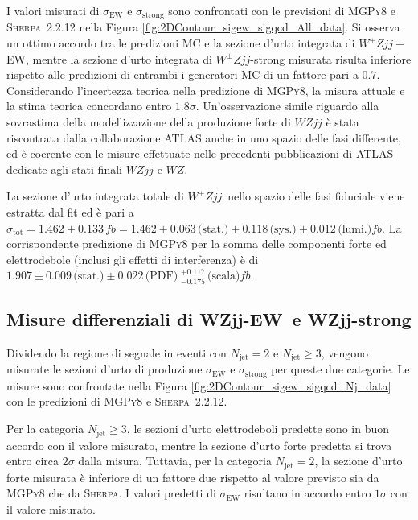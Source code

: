 \documentclass[11pt]{article}
\newcommand{\wzjjew}{$W^\pm Z jj-$ EW}
\newcommand{\wzjj}{$W^\pm Z jj$}
\begin{document}
I valori misurati di $\sigma_{\text{EW}}$ e $\sigma_{\text{strong}}$ sono confrontati con le previsioni di \textsc{MGPy8} e \textsc{Sherpa}~2.2.12 nella Figura \ref{fig:2DContour_sigew_sigqcd_All_data}. Si osserva un ottimo accordo tra le predizioni MC e la sezione d'urto integrata di \wzjjew, mentre la sezione d'urto integrata di \wzjj-strong misurata risulta inferiore rispetto alle predizioni di entrambi i generatori MC di un fattore pari a $0.7$. Considerando l'incertezza teorica nella predizione di \textsc{MGPy8}, la misura attuale e la stima teorica concordano entro $1.8\sigma$. Un'osservazione simile riguardo alla sovrastima della modellizzazione della produzione forte di $WZjj$ è stata riscontrata dalla collaborazione ATLAS anche in uno spazio delle fasi differente, ed è coerente con le misure effettuate nelle precedenti pubblicazioni di ATLAS dedicate agli stati finali $WZjj$ e $WZ$.

La sezione d'urto integrata totale di \wzjj\ nello spazio delle fasi fiduciale viene estratta dal fit ed è pari a $\sigma_{\text{tot}} = 1.462 \pm 0.133\,\unit{fb} = 1.462 \pm 0.063\,\text{(stat.)} \pm 0.118\,\text{(sys.)} \pm 0.012\,\text{(lumi.)} \unit{fb}$. La corrispondente predizione di \textsc{MGPy8} per la somma delle componenti forte ed elettrodebole (inclusi gli effetti di interferenza) è di $1.907 \pm 0.009\,\text{(stat.)} \pm 0.022\,\text{(PDF)} \; ^{+0.117}_{-0.175}\,\text{(scala)} \unit{fb}$.


\subsection{Misure differenziali di WZjj-EW\ e WZjj-strong}
\label{sec:results_ew_diff}

Dividendo la regione di segnale in eventi con $N_{\text{jet}} = 2$ e $N_{\text{jet}} \ge 3$, vengono misurate le sezioni d'urto di produzione $\sigma_{\text{EW}}$ e $\sigma_{\text{strong}}$ per queste due categorie. Le misure sono confrontate nella Figura \ref{fig:2DContour_sigew_sigqcd_Nj_data} con le predizioni di \textsc{MGPy8} e \textsc{Sherpa}~2.2.12. 

Per la categoria $N_{\text{jet}} \ge 3$, le sezioni d'urto elettrodeboli predette sono in buon accordo con il valore misurato, mentre la sezione d'urto forte predetta si trova entro circa $2\sigma$ dalla misura. Tuttavia, per la categoria $N_{\text{jet}} = 2$, la sezione d'urto forte misurata è inferiore di un fattore due rispetto al valore previsto sia da \textsc{MGPy8} che da \textsc{Sherpa}. I valori predetti di $\sigma_{\text{EW}}$ risultano in accordo entro $1\sigma$ con il valore misurato.
\end{document}
